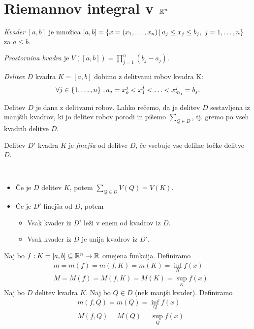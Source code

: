 \section{Riemannov integral v $\mathbb{R}^n$}
\begin{definicija}
    \emph{Kvader} \([a,b]\) je množica \([a,b] = \left\{x = (x_1, \ldots, x_n) \,|\, a_j \leq x_j \leq b_j, \ j = 1, \ldots, n\right\}\) za \(a \leq b\). 

    \emph{Prostornina kvadra} je \(V([a,b]) = \prod_{j=1}^{n} (b_j - a_j)\).
\end{definicija}

\begin{definicija}
    \emph{Delitev \(D\)} kvadra \(K = [a,b]\) dobimo z delitvami robov kvadra K:
    \[\forall j \in \left\{1, \ldots, n\right\} \,.\, a_j = x_o^j < x_1^j < \ldots < x_{m_j}^j = b_j.\]
\end{definicija}

\begin{opomba}
    Delitev \(D\) je dana z delitvami robov. Lahko rečemo, da je delitev \(D\) sestavljena iz manjših kvadrov, ki jo delitev robov porodi in pišemo \(\sum_{Q \in D}\), tj. gremo po vseh kvadrih delitve \(D\).
\end{opomba}

\begin{definicija}
    Delitev \(D'\) kvadra \(K\) je \emph{finejša} od delitve \(D\), če vsebuje vse delilne točke delitve \(D\).
\end{definicija}

\begin{opomba}
    \ 
    \begin{itemize}
        \item Če je \(D\) delitev \(K\), potem \(\sum_{Q \in D} V(Q) = V(K)\).
        \item Če je \(D'\) finejša od \(D\), potem
        \begin{itemize}
            \item Vsak kvader iz \(D'\) leži v enem od kvadrov iz \(D\).
            \item Vsak kvader iz \(D\) je unija kvadrov iz \(D'\).
        \end{itemize}
    \end{itemize}
\end{opomba}

Naj bo \(f: K = [a,b] \subseteq \mathbb{R}^n \to \mathbb{R}\) omejena funkcija. Definiramo
\begin{align*}
    &m = m(f) = m(f, K) = m(K) = \inf_K f(x)  \\
    &M = M(f) = M(f, K) = M(K) = \sup_K f(x) 
\end{align*}
Naj bo \(D\) delitev kvadra \(K\). Naj bo \(Q \in D\) (nek manjši kvader). Definiramo
\begin{align*}
    &m(f, Q) = m(Q) = \inf_Q f(x)  \\
    &M(f, Q) = M(Q) = \sup_Q f(x)  
\end{align*}

